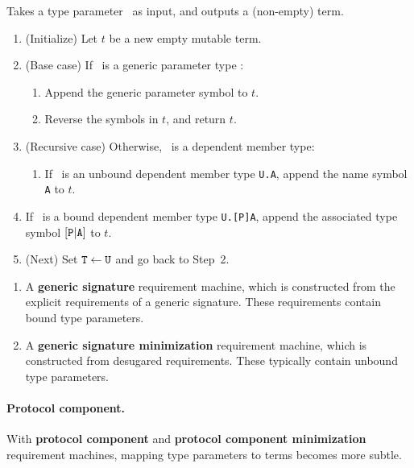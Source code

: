 \documentclass[../generics]{subfiles}
\begin{document}
\begin{algorithm}\label{build term generic}
Takes a type parameter \tT\ as input, and outputs a (non-empty) term.
\begin{enumerate}
\item (Initialize) Let $t$ be a new empty mutable term.
\item (Base case) If \tT\ is a generic parameter type :
\begin{enumerate}
\item Append the generic parameter symbol  to $t$.
\item Reverse the symbols in $t$, and return $t$.
\end{enumerate}
\item (Recursive case) Otherwise, \tT\ is a dependent member type:
\begin{enumerate}
\item If \tT\ is an unbound dependent member type \verb|U.A|, append the name symbol \texttt{A} to $t$.
\end{enumerate}
\item If \tT\ is a bound dependent member type \verb|U.[P]A|, append the associated type symbol $[\texttt{P}|\texttt{A}]$ to $t$.
\item (Next) Set $\texttt{T} \leftarrow \texttt{U}$ and go back to Step~2.
\end{enumerate}
\end{algorithm}

\begin{enumerate}
\item A \textbf{generic signature} requirement machine, which is constructed from the explicit requirements of a generic signature. These requirements contain bound type parameters.
\item A \textbf{generic signature minimization} requirement machine, which is constructed from desugared requirements. These typically contain unbound type parameters.
\end{enumerate}

\paragraph{Protocol component.}
%
\IndexSelf%
With \textbf{protocol component} and \textbf{protocol component minimization} requirement machines, mapping type parameters to terms becomes more subtle.
\end{document}
